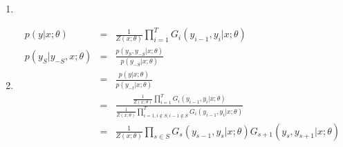 \documentclass[12pt]{article}
\begin{document}
\begin{enumerate}[label=(\alph*)]
  \item 
  \item 
  \begin{eqnarray*}
  p(y | x; \theta) &=& \frac{1}{Z(x;\theta)} \prod_{i = 1}^T G_i(y_{i-1}, y_i| x; \theta)\\
  p(y_S | y_{-S}, x; \theta) &=& \frac{p(y_S, y_{-S} | x; \theta)}{p(y_{-S}| x; \theta)}\\
  &=& \frac{p(y | x; \theta)}{p(y_{-t}| x; \theta)}\\
  &=& \frac{\frac{1}{Z(x;\theta)} \prod_{i = 1}^T G_i(y_{i-1}, y_i| x; \theta)}{\frac{1}{Z(x;\theta)} \prod_{i = 1, i \notin S, i-1 \notin S}^T G_i(y_{i-1}, y_i| x; \theta)}\\
  &=& \frac{1}{Z(x;\theta)} \prod_{s \in S} G_s(y_{s-1}, y_s | x; \theta) G_{s+1}(y_s, y_{s+1} | x; \theta)\\
  \end{eqnarray*}
\end{enumerate}
\end{document}

